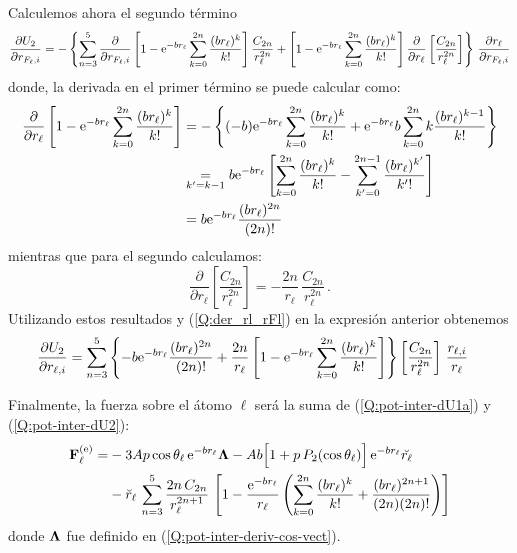 \begin{subappendices}
Calculemos ahora el segundo t\'{e}rmino
\begin{equation*}
  \frac{\partial U_{2}}{\partial r_{F_{\ell},i}} = - \left\{\sum_{n=3}^{5} \frac{\partial}{\partial r_{F_{\ell},i}}\left[ 1 - \mathrm{e}^{-br_{\ell}} \sum_{k=0}^{2n}\frac{(br_{\ell})^{k}}{k!}\right] \frac{C_{2n}}{r_{\ell}^{2n}} + \left[ 1 - \mathrm{e}^{-br_{\ell}} \sum_{k=0}^{2n}\frac{(br_{\ell})^{k}}{k!}\right] \frac{\partial}{\partial r_{\ell}}\left[ \frac{C_{2n}}{r_{\ell}^{2n}}\right] \right\} \, \frac{\partial r_{\ell}}{\partial r_{F_{\ell},i}}
\end{equation*}
%
donde, la derivada en el primer t\'{e}rmino se puede calcular como:
\begin{align*}
 \frac{\partial}{\partial r_{\ell}}\left[ 1 - \mathrm{e}^{-br_{\ell}} \sum_{k=0}^{2n}\frac{(br_{\ell})^{k}}{k!}\right] &= - \left\{(-b) \mathrm{e}^{-br_{\ell}} \sum_{k=0}^{2n}\frac{(br_{\ell})^{k}}{k!} + \mathrm{e}^{-br_{\ell}} b \, { \sum_{k=0}^{2n}  k \frac{(br_{\ell})^{k-1}}{k!}} \right\} 
\\
&\mathrel{\mathop{\kern0pt=}\limits_{k'=k-1}}  b \mathrm{e}^{-br_{\ell}} \left[\sum_{k=0}^{2n}\frac{(br_{\ell})^{k}}{k!} - \sum_{k'=0}^{2n-1} \frac{(br_{\ell})^{k'}}{k'!}\right] 
\\
&=  b \mathrm{e}^{-br_{\ell}} \frac{(b r_{\ell})^{2n}}{(2n)!}
\end{align*}
%
mientras que para el segundo calculamos:
\begin{equation*}
 \frac{\partial}{\partial r_{\ell}}\left[ \frac{C_{2n}}{r_{\ell}^{2n}}\right] = -\frac{2n}{r_{\ell}}\, \frac{C_{2n}}{r_{\ell}^{2n}} \,.
\end{equation*}
%
Utilizando estos resultados y (\ref{Q:der_rl_rFl}) en la expresi\'{o}n anterior obtenemos
\begin{align}\label{Q:pot-inter-dU2}
  \frac{\partial U_{2}}{\partial r_{\ell,i}} &= \sum_{n=3}^{5} \left\{ -b \mathrm{e}^{-br_{\ell}} \frac{(b r_{\ell})^{2n}}{(2n)!} + \frac{2n}{r_{\ell}} \left[ 1 - \mathrm{e}^{-br_{\ell}} \sum_{k=0}^{2n}\frac{(br_{\ell})^{k}}{k!}\right] \right\}  \left[ \frac{C_{2n}}{r_{\ell}^{2n}}\right]\, \frac{r_{\ell,i}}{r_{\ell}} 
\end{align}
\medskip

Finalmente, la fuerza sobre el \'{a}tomo $\ell$ ser\'{a} la suma de (\ref{Q:pot-inter-dU1a}) y (\ref{Q:pot-inter-dU2}): 
%
\begin{align} \label{Q:pot-inter-fuerzas}
    \mathbf{F}^{\text{(e)}}_{\ell} =& - 3 A p \cos \theta_{\ell}\, \mathrm{e}^{-b r_{\ell}} \mathbf{\Lambda} - A b \Big[1 + p\, P_{2}(\cos \theta_{\ell})\Big]\,\mathrm{e}^{-b r_{\ell}} \breve{r_{\ell}} \nonumber \\
                     &- \breve{r}_{\ell}\, \sum_{n=3}^{5} \frac{2 n\, C_{2n}}{r_{\ell}^{2n+1}} \,\left[ 1 - \frac{\mathrm{e}^{-br_{\ell}}}{r_{\ell}} \left( \sum_{k=0}^{2n}\frac{(br_{\ell})^{k}}{k!} + \frac{(br_{\ell})^{2n+1}}{(2n)(2n)!} \right) \right] 
\end{align}
%
donde $\mathbf{\Lambda}$ fue definido en (\ref{Q:pot-inter-deriv-cos-vect}).



\end{subappendices}
